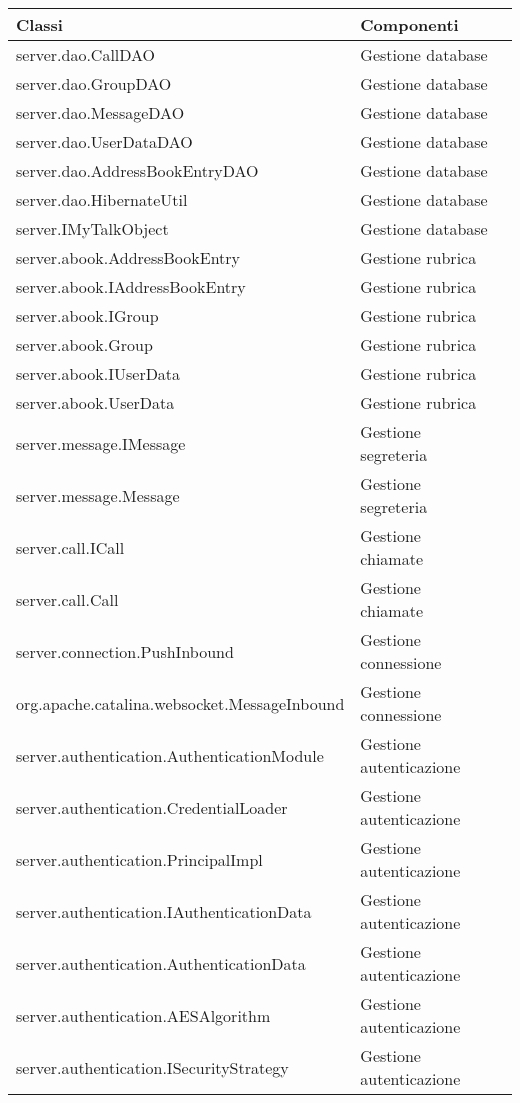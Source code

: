 \begin{center}
\begin{longtable}{lp{}l}
\toprule Classi & Componenti\\
\midrule

server.dao.CallDAO & Gestione database\\
server.dao.GroupDAO & Gestione database\\
server.dao.MessageDAO & Gestione database\\
server.dao.UserDataDAO & Gestione database\\
server.dao.AddressBookEntryDAO & Gestione database\\
server.dao.HibernateUtil & Gestione database\\
server.IMyTalkObject & Gestione database\\
server.abook.AddressBookEntry & Gestione rubrica\\
server.abook.IAddressBookEntry& Gestione rubrica\\
server.abook.IGroup & Gestione rubrica\\
server.abook.Group & Gestione rubrica\\
server.abook.IUserData & Gestione rubrica\\
server.abook.UserData & Gestione rubrica\\
server.message.IMessage & Gestione segreteria\\
server.message.Message & Gestione segreteria\\
server.call.ICall & Gestione chiamate\\
server.call.Call & Gestione chiamate\\
server.connection.PushInbound & Gestione connessione\\
org.apache.catalina.websocket.MessageInbound & Gestione connessione\\
server.authentication.AuthenticationModule & Gestione autenticazione\\
server.authentication.CredentialLoader & Gestione autenticazione\\
server.authentication.PrincipalImpl & Gestione autenticazione\\
server.authentication.IAuthenticationData & Gestione autenticazione\\
server.authentication.AuthenticationData & Gestione autenticazione\\
server.authentication.AESAlgorithm & Gestione autenticazione\\
server.authentication.ISecurityStrategy & Gestione autenticazione\\

\end{longtable}
\end{center}
